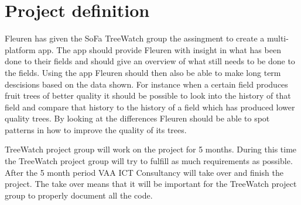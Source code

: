 
\section {Project definition}
Fleuren has given the SoFa TreeWatch group the assingment to create a multi-platform app. The app should provide Fleuren with insight in what has been done to their fields and should give an overview of what still needs to be done to the fields. Using the app Fleuren should then also be able to make long term descisions based on the data shown. For instance when a certain field produces fruit trees of better quality it should be possible to look into the history of that field and compare that history to the history of a field which has produced lower quality trees. By looking at the differences Fleuren should be able to spot patterns in how to improve the quality of its trees.

TreeWatch project group will work on the project for 5 months. During this time the TreeWatch project group will try to fulfill as much requirements as possible. After the 5 month period VAA ICT Consultancy will take over and finish the project. The take over means that it will be important for the TreeWatch project group to properly document all the code.